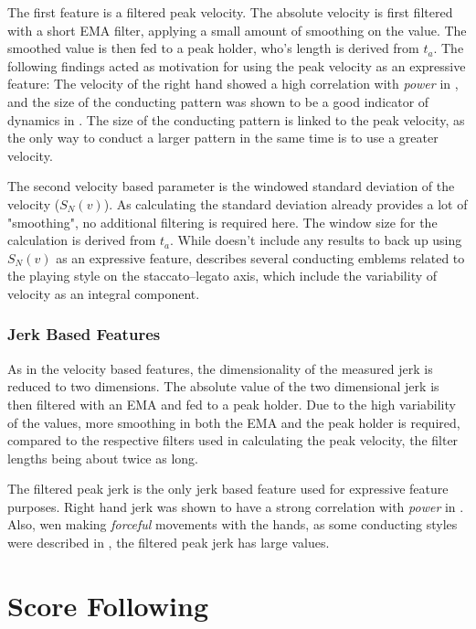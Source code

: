 The first feature is a filtered peak velocity.
The absolute velocity is first filtered with a short EMA filter,
applying a small amount of smoothing on the value.
The smoothed value is then fed to a peak holder,
who's length is derived from $t_a$.
The following findings acted as
motivation for using the peak velocity as an expressive feature:
The velocity of the right hand showed a
high correlation with \textit{power}
in \cite{luck2010},
and the size of the conducting pattern
was shown to be a good indicator of dynamics in \cite{sousa1988}.
The size of the conducting pattern is linked
to the peak velocity,
as the only way to conduct a larger pattern in the same time
is to use a greater velocity.

The second velocity based parameter is the
windowed standard deviation of the velocity ($S_N(v)$).
As calculating the standard deviation
already provides a lot of "smoothing",
no additional filtering is required here.
The window size for the calculation
is derived from $t_a$.
While \cite{luck2010} doesn't include any results
to back up using $S_N(v)$ as an expressive feature,
\cite{sousa1988} describes several conducting emblems
related to the playing style on the staccato--legato axis,
which include the variability of velocity as an integral component.

\subsection{Jerk Based Features}

As in the velocity based features,
the dimensionality of the measured jerk
is reduced to two dimensions.
The absolute value of the two dimensional jerk
is then filtered with an EMA
and fed to a peak holder.
Due to the high variability of the values,
more smoothing in both the EMA and the peak holder is required,
compared to the respective filters used in calculating the peak velocity,
the filter lengths being about twice as long.

The filtered peak jerk is the only jerk based feature used
for expressive feature purposes.
Right hand jerk was shown to have a
strong correlation with \textit{power} in \cite{luck2010}.
Also,
wen making \textit{forceful} movements with the hands,
as some conducting styles were described in \cite{sousa1988},
the filtered peak jerk has large values.


\chapter{Score Following}
\label{chapter:score_following}

